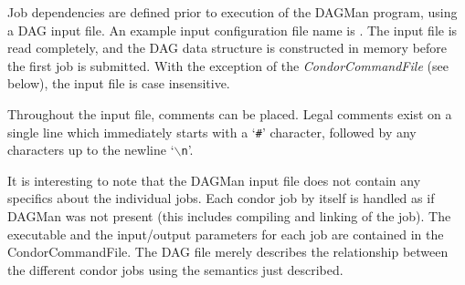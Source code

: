 Job dependencies are defined prior to execution of the DAGMan program, using a
DAG input file.  An example input configuration file name is .
The input file is read completely, and the DAG data structure is constructed
in memory before the first job is submitted.  With the exception of the
\textit{CondorCommandFile} (see below), the input file is case insensitive.

Throughout the input file, comments can be placed.  Legal comments exist on a
single line which immediately starts with a `\texttt{\#}' character, followed
by any characters up to the newline `\texttt{$\backslash$n}'.

It is interesting to note that the DAGMan input file does not contain any
specifics about the individual jobs. Each condor job by itself is handled as
if DAGMan was not present (this includes compiling and linking of the
job). The executable and the input/output parameters for each job are
contained in the CondorCommandFile.  The DAG file merely describes the
relationship between the different condor jobs using the semantics just
described.

